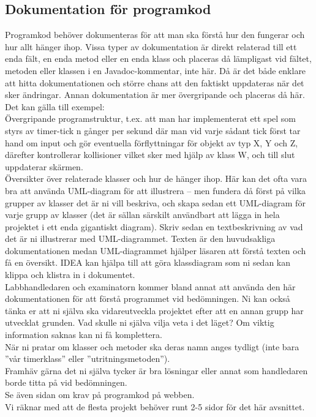 \subsection{Dokumentation för programkod}
Programkod behöver dokumenteras för att man ska förstå hur den fungerar och hur allt hänger ihop.  Vissa typer av dokumentation är direkt relaterad till ett enda fält, en enda metod eller en enda klass och placeras då lämpligast vid fältet, metoden eller klassen i en Javadoc-kommentar, inte här.  Då är det både enklare att hitta dokumentationen och större chans att den faktiskt uppdateras när det sker ändringar.  Annan dokumentation är mer övergripande och placeras då här.  Det kan gälla till exempel:\\
Övergripande programstruktur, t.ex. att man har implementerat ett spel som styrs av timer-tick n gånger per sekund där man vid varje sådant tick först tar hand om input och gör eventuella förflyttningar för objekt av typ X, Y och Z, därefter kontrollerar kollisioner vilket sker med hjälp av klass W, och till slut uppdaterar skärmen.\\
\vspace{11pt}
Översikter över relaterade klasser och hur de hänger ihop.  Här kan det ofta vara bra att använda UML-diagram för att illustrera – men fundera då först på vilka grupper av klasser det är ni vill beskriva, och skapa sedan ett UML-diagram för varje grupp av klasser (det är sällan särskilt användbart att lägga in hela projektet i ett enda gigantiskt diagram).  Skriv sedan en textbeskrivning av vad det är ni illustrerar med UML-diagrammet.  Texten är den huvudsakliga dokumentationen medan UML-diagrammet hjälper läsaren att förstå texten och få en översikt.  IDEA kan hjälpa till att göra klassdiagram som ni sedan kan klippa och klistra in i dokumentet.\\
\vspace{11pt}
Labbhandledaren och examinatorn kommer bland annat att använda den här dokumentationen för att förstå programmet vid bedömningen.  Ni kan också tänka er att ni själva ska vidareutveckla projektet efter att en annan grupp har utvecklat grunden.  Vad skulle ni själva vilja veta i det läget?  Om viktig information saknas kan ni få komplettera.\\
När ni pratar om klasser och metoder ska deras namn anges tydligt (inte bara ”vår timerklass” eller ”utritningsmetoden”).\\
Framhäv gärna det ni själva tycker är bra lösningar eller annat som handledaren borde titta på vid bedömningen.\\
Se även sidan om krav på programkod på webben.\\
Vi räknar med att de flesta projekt behöver runt 2-5 sidor för det här avsnittet.\\
